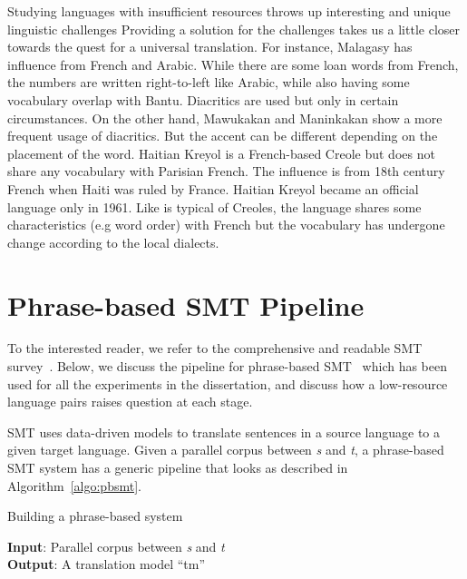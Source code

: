 Studying languages with insufficient resources throws up interesting and unique linguistic challenges  Providing a solution for the challenges takes us a little closer towards the quest for a universal translation. For instance, Malagasy has influence from French and Arabic. While there are some loan words from French, the numbers are written right-to-left like Arabic, while also having some vocabulary overlap with Bantu. Diacritics are used but only in certain circumstances. On the other hand, Mawukakan and Maninkakan show a more frequent usage of diacritics. But the accent can be different depending on the placement of the word. Haitian Kreyol is a French-based Creole but does not share any vocabulary with Parisian French. The influence is from 18th century French when Haiti was ruled by France. Haitian Kreyol became an official language only in 1961. Like is typical of Creoles, the language shares some characteristics (e.g word order) with French but the vocabulary has undergone change according to the local dialects. 

\section{Phrase-based SMT Pipeline}
To the interested reader, we refer to the comprehensive and readable SMT survey~\cite{Lopez07asurvey}. Below, we discuss the pipeline for phrase-based SMT~\cite{Koehn:03} which has been used for all the experiments in the dissertation, and discuss how a low-resource language pairs raises question at each stage. 

SMT uses data-driven models to translate sentences in a source language to a given target language. Given a parallel corpus between \emph{s} and \emph{t}, a phrase-based SMT system has a generic pipeline that looks as described in Algorithm~\ref{algo:pbsmt}. 

\begin{algorithm}
\small
\caption{Building a phrase-based system}
\label{algo:pbsmt}
\textbf{Input}: Parallel corpus between \emph{s} and \emph{t} \\
\textbf{Output}: A translation model ``tm'' 
\begin{algorithmic}[l]
	 \label{aline:alignments}
	 \label{aline:scores}
	 \label{aline:MERT}
	 \label{aline:decoding}
\end{algorithmic}
\end{algorithm}


